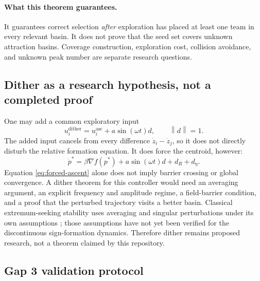 \documentclass[11pt]{article}
\newcommand{\norm}[1]{\left\lVert #1\right\rVert}
\begin{document}
\paragraph{What this theorem guarantees.}
It guarantees correct selection \emph{after} exploration has placed at least one team in every relevant basin. It does not prove that the seed set covers unknown attraction basins. Coverage construction, exploration cost, collision avoidance, and unknown peak number are separate research questions.

\subsection{Dither as a research hypothesis, not a completed proof}

One may add a common exploratory input
\begin{equation}\label{eq:common-dither}
    u_i^{\mathrm{dither}}=u_i^{\mathrm{asc}}+a\sin(\omega t)d,
    \qquad \norm d=1.
\end{equation}
The added input cancels from every difference $\dot z_i-\dot z_j$, so it does not directly disturb the relative formation equation. It does force the centroid, however:
\begin{equation}\label{eq:forced-ascent}
    \dot p^*=\beta\nabla f(p^*)+a\sin(\omega t)d+d_R+d_\eta.
\end{equation}
Equation \eqref{eq:forced-ascent} alone does not imply barrier crossing or global convergence. A dither theorem for this controller would need an averaging argument, an explicit frequency and amplitude regime, a field-barrier condition, and a proof that the perturbed trajectory visits a better basin. Classical extremum-seeking stability uses averaging and singular perturbations under its own assumptions \cite{krsticwang2000}; those assumptions have not yet been verified for the discontinuous sign-formation dynamics. Therefore dither remains proposed research, not a theorem claimed by this repository.

\subsection{Gap 3 validation protocol}\label{sec:gap3-validation}
\end{document}
